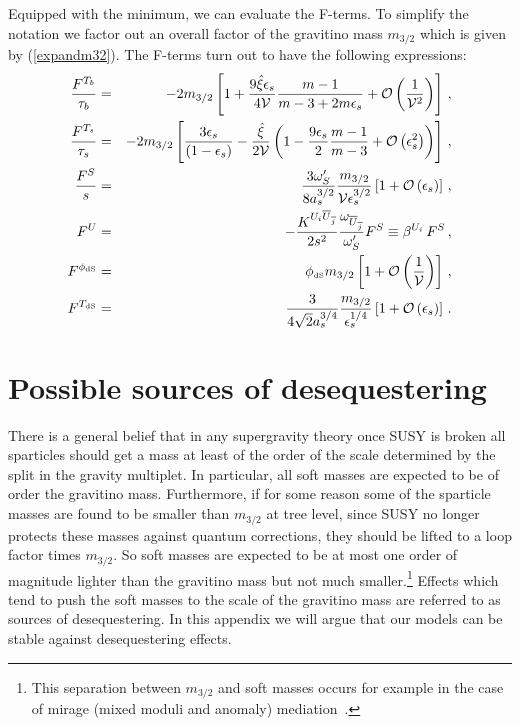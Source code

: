 \documentclass[11pt,a4paper]{article}
\newcommand{\bea}{\begin{eqnarray}}
\newcommand{\eea}{\end{eqnarray}}
\def\dS{{\scriptscriptstyle \rm dS}}
\newcommand\vo{{\mathcal{V}}}
\newcommand{\mc}{\mathcal}
\begin{document}
Equipped with the minimum, we can evaluate the F-terms. To simplify the notation we factor out an overall factor of the gravitino mass $m_{3/2}$ which is given by (\ref{expandm32}). The F-terms turn out to have the following expressions:
\bea
\frac{F^{T_b}}{\tau_b}&=&-2 m_{3/2}\left[1+\frac{9 \hat{\xi} \epsilon_s}{4 \vo} \frac{m-1}{m-3+2m\epsilon_s} +\mc{O}\left(\frac{1}{\vo^2}\right)\right]\,, \\
\frac{F^{T_s}}{\tau_s}&=& -2 m_{3/2}\left[\frac{3\epsilon_s}{(1-\epsilon_s)}-\frac{\hat{\xi}}{2\vo}
\left(1-\frac{9\epsilon_s}{2}\frac{m-1}{m-3}+\mc{O}\left(\epsilon_s^2\right)\right)\right]\,, \\
\frac{F^S}{s}&=& \frac{3 \omega'_S }{8 a_s^{3/2}}  \frac{m_{3/2}}{\vo\epsilon_s^{3/2}}\left[1+\mc{O}\left(\epsilon_s\right)\right]\,, \\
F^U&=& - \frac{K^{U_i \overline{U}_{\overline{j}}}}{2 s^2}\frac{\omega_{\overline{U}_{\overline{j}}}}{\omega'_S}F^S\equiv \beta^{U_i}\,F^S\,, \\
F^{\phi_\dS} &=& \phi_\dS m_{3/2}\left[1+ \mc{O}\left(\frac{1}{\vo}\right)\right] \,, \\
F^{T_{\dS}}&=& \frac{3}{4\sqrt{2}a_s^{3/4}}\frac{m_{3/2}}{\epsilon_s^{1/4}}\left[1+\mc{O}\left(\epsilon_s\right)\right]\,.
\eea


\section{Possible sources of desequestering}
\label{sec:deseq}

There is a general belief that in any supergravity theory once SUSY is broken all sparticles should get a mass at least of the order of the scale determined by the split in the gravity multiplet. In particular, all soft masses are expected to be of order the gravitino mass. Furthermore, if for some reason some of the sparticle masses are found to be smaller than $m_{3/2}$ at tree level, since SUSY no longer protects these masses against quantum corrections, they should be lifted to a loop factor times $m_{3/2}$. So soft masses are expected to be at most one order of magnitude lighter than the gravitino mass but not much smaller.\footnote{This separation between $m_{3/2}$ and soft masses occurs for example in the case of mirage (mixed moduli and anomaly) mediation~\cite{LoaizaBrito:2005fa}.}
Effects which tend to push the soft masses to the scale of the gravitino mass are referred to as sources of desequestering.
In this appendix we will argue that our models can be stable against desequestering effects.
\end{document}
